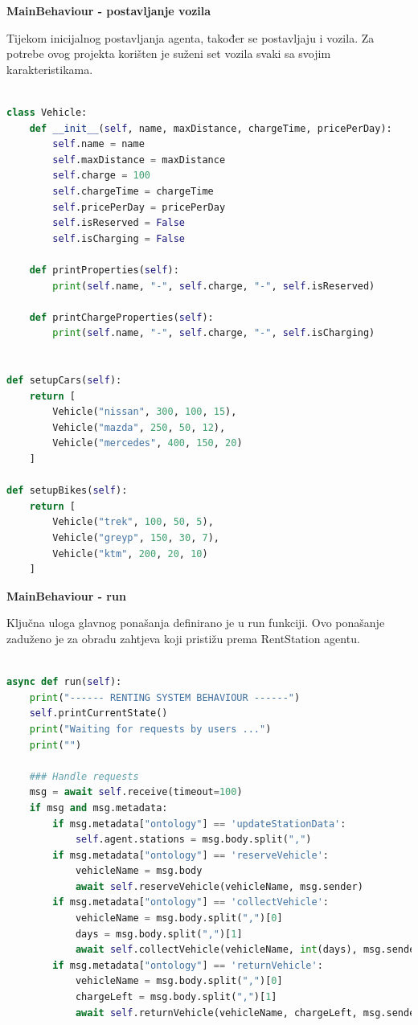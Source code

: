 \documentclass{foi}
\begin{document}
\begin{flushleft}\textbf{MainBehaviour - postavljanje vozila}\end{flushleft}

Tijekom inicijalnog postavljanja agenta, također se postavljaju i vozila. Za potrebe ovog projekta korišten je suženi set vozila svaki sa svojim karakteristikama.

\begin{lstlisting}[language=Python]

class Vehicle:
	def __init__(self, name, maxDistance, chargeTime, pricePerDay):
		self.name = name
		self.maxDistance = maxDistance
		self.charge = 100
		self.chargeTime = chargeTime
		self.pricePerDay = pricePerDay
		self.isReserved = False
		self.isCharging = False

	def printProperties(self): 
		print(self.name, "-", self.charge, "-", self.isReserved)
	
	def printChargeProperties(self): 
		print(self.name, "-", self.charge, "-", self.isCharging)


def setupCars(self):
	return [
		Vehicle("nissan", 300, 100, 15),
		Vehicle("mazda", 250, 50, 12),
		Vehicle("mercedes", 400, 150, 20)
	]

def setupBikes(self):
	return [
		Vehicle("trek", 100, 50, 5),
		Vehicle("greyp", 150, 30, 7),
		Vehicle("ktm", 200, 20, 10)
	]
\end{lstlisting}

\begin{flushleft}\textbf{MainBehaviour - run}\end{flushleft}

Ključna uloga glavnog ponašanja definirano je u run funkciji. Ovo ponašanje zaduženo je za obradu zahtjeva koji pristižu prema RentStation agentu.

\begin{lstlisting}[language=Python]

async def run(self):
	print("------ RENTING SYSTEM BEHAVIOUR ------")
	self.printCurrentState()
	print("Waiting for requests by users ...")
	print("")

	### Handle requests
	msg = await self.receive(timeout=100)
	if msg and msg.metadata:
		if msg.metadata["ontology"] == 'updateStationData':
			self.agent.stations = msg.body.split(",")
		if msg.metadata["ontology"] == 'reserveVehicle':
			vehicleName = msg.body
			await self.reserveVehicle(vehicleName, msg.sender)
		if msg.metadata["ontology"] == 'collectVehicle':
			vehicleName = msg.body.split(",")[0]
			days = msg.body.split(",")[1]
			await self.collectVehicle(vehicleName, int(days), msg.sender)
		if msg.metadata["ontology"] == 'returnVehicle':
			vehicleName = msg.body.split(",")[0]
			chargeLeft = msg.body.split(",")[1]
			await self.returnVehicle(vehicleName, chargeLeft, msg.sender)

\end{lstlisting}
\end{document}
